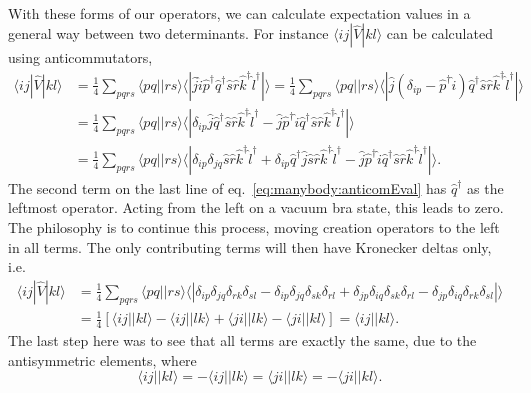 \paragraph*{}
With these forms of our operators, we can calculate expectation values in a
general way between two determinants.
For instance $\langle ij|\hat{V}|kl \rangle$ can be calculated using anticommutators,
\begin{equation}
\label{eq:manybody:anticomEval}
\begin{split}
\langle ij|\hat{V}|kl \rangle &= 
\frac{1}{4} \sum_{pqrs} \langle pq||rs \rangle 
\langle | \hat{j}\hat{i} 
\hat{p}^{\dagger} \hat{q}^{\dagger} \hat{s} \hat{r}
\hat{k}^{\dagger} \hat{l}^{\dagger} | \rangle 
= 
\frac{1}{4} \sum_{pqrs} \langle pq||rs \rangle 
\langle | \hat{j}
\left(\delta_{ip} -  \hat{p}^{\dagger} \hat{i} \right)
\hat{q}^{\dagger} \hat{s} \hat{r}
\hat{k}^{\dagger} \hat{l}^{\dagger} | \rangle \\
%
&= 
\frac{1}{4} \sum_{pqrs} \langle pq||rs \rangle \langle |
 \delta_{ip}  \hat{j}\hat{q}^{\dagger} \hat{s} \hat{r}\hat{k}^{\dagger}\hat{l}^{\dagger} -
\hat{j}  \hat{p}^{\dagger} \hat{i} \hat{q}^{\dagger} \hat{s} \hat{r}\hat{k}^{\dagger} \hat{l}^{\dagger} 
| \rangle  \\
&= 
\frac{1}{4} \sum_{pqrs} \langle pq||rs \rangle \langle |
\delta_{ip} \delta_{jq} \hat{s} \hat{r}\hat{k}^{\dagger}\hat{l}^{\dagger} +
\delta_{ip} \hat{q}^{\dagger}  \hat{j}\hat{s} \hat{r}\hat{k}^{\dagger}\hat{l}^{\dagger} -
\hat{j}  \hat{p}^{\dagger} \hat{i} \hat{q}^{\dagger} \hat{s} \hat{r}\hat{k}^{\dagger} \hat{l}^{\dagger} 
| \rangle .
\end{split}
\end{equation}
The second term on the last line of eq.~\eqref{eq:manybody:anticomEval} has $\hat{q}^{\dagger}$ as the leftmost operator.
Acting from the left on a vacuum bra state, this leads to zero.
The philosophy is to continue this process, moving creation operators
to the left in all terms.
The only contributing terms will then have Kronecker deltas only, i.e.
\begin{equation}
\label{eq:manybody:evaluationanticom}
\begin{split}
\langle ij|\hat{V}|kl \rangle &= 
\frac{1}{4} \sum_{pqrs} \langle pq||rs \rangle \langle |
\delta_{ip} \delta_{jq} \delta_{rk} \delta_{sl}
- \delta_{ip} \delta_{jq} \delta_{sk} \delta_{rl}
+ \delta_{jp} \delta_{iq} \delta_{sk} \delta_{rl}
- \delta_{jp} \delta_{iq} \delta_{rk} \delta_{sl}
|\rangle \\
&=
\frac{1}{4} \left[
 \langle ij||kl \rangle
-\langle ij||lk \rangle
+\langle ji||lk \rangle
-\langle ji||kl \rangle
\right]
=
\langle ij||kl \rangle .
\end{split}
\end{equation}
The last step here was to see that all terms are exactly the same, due to the
antisymmetric elements, where
\begin{equation}
 \langle ij||kl \rangle =
-\langle ij||lk \rangle =
\langle ji||lk \rangle =
-\langle ji||kl \rangle .
\end{equation}


